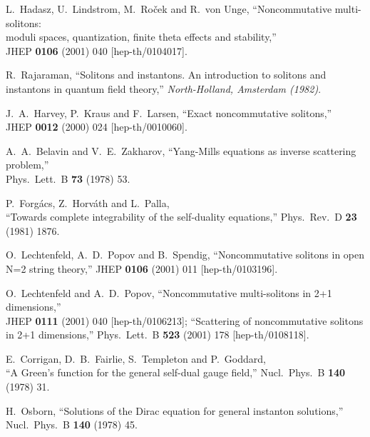 \documentclass[a4paper,11pt]{article}
\numberwithin{equation}{section}
\begin{document}
{\begin{thebibliography}{99}
L.~Hadasz, U.~Lindstrom, M.~Ro\v cek and R.~von Unge,
``Noncommutative multi-solitons: \\ moduli spaces, quantization, 
  finite theta effects and stability,''\\
JHEP {\bf 0106} (2001) 040
[hep-th/0104017].

R.~Rajaraman,
``Solitons and instantons. 
  An introduction to solitons and instantons in quantum field theory,''
{\it North-Holland, Amsterdam (1982)}.

J.~A.~Harvey, P.~Kraus and F.~Larsen,
``Exact noncommutative solitons,''\\
JHEP {\bf 0012} (2000) 024
[hep-th/0010060].

A.~A.~Belavin and V.~E.~Zakharov,
``Yang-Mills equations as inverse scattering problem,''\\
Phys.\ Lett.\ B {\bf 73} (1978) 53.

P.~Forg\'acs, Z.~Horv\'ath and L.~Palla,\\
``Towards complete integrability of the self-duality equations,''
Phys.\ Rev.\ D {\bf 23} (1981) 1876.

O.~Lechtenfeld, A.~D.~Popov and B.~Spendig,
``Noncommutative solitons in open N=2 string theory,''
JHEP {\bf 0106} (2001) 011
[hep-th/0103196].

O.~Lechtenfeld and A.~D.~Popov,
``Noncommutative multi-solitons in 2+1 dimensions,''\\
JHEP {\bf 0111} (2001) 040
[hep-th/0106213];
``Scattering of noncommutative solitons in 2+1 dimensions,''
Phys.\ Lett.\ B {\bf 523} (2001) 178
[hep-th/0108118].

E.~Corrigan, D.~B.~Fairlie, S.~Templeton and P.~Goddard,\\
``A Green's function for the general self-dual gauge field,''
Nucl.\ Phys.\ B {\bf 140} (1978) 31.

H.~Osborn,
``Solutions of the Dirac equation for general instanton solutions,''\\
Nucl.\ Phys.\ B {\bf 140} (1978) 45.
\end{thebibliography} 

}
\end{document}
